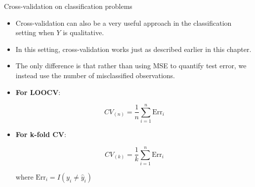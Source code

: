 \begin{frame}{Cross-validation on classification problems}

\begin{itemize}
    \item Cross-validation can also be a very useful
approach in the classification setting when $Y$ is qualitative. \pause

    \item In this setting, cross-validation works just as described earlier in this chapter. \pause 
    
    \item The only difference is that rather than using MSE to quantify test error, we instead use the number of misclassified observations. \pause 

    \item \textbf{For LOOCV}:

    \begin{equation*}
        CV_{(n)} = \frac{1}{n} \sum_{i=1}^n \text{Err}_i 
    \end{equation*} \pause
    
    \item \textbf{For k-fold CV}:

    \begin{equation*}
        CV_{(k)} = \frac{1}{k} \sum_{i=1}^n \text{Err}_i 
    \end{equation*}

    where $\text{Err}_i = I(y_i \not = \hat{y}_i)$ \pause
        
    \end{itemize} 
    
    
\end{frame}
